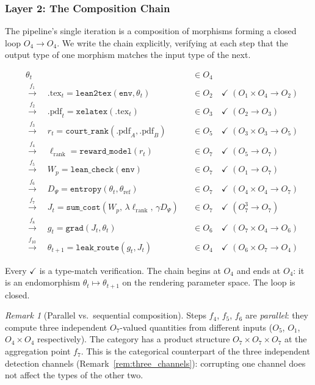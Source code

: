 \documentclass[11pt,a4paper]{article}
\theoremstyle{definition}
\theoremstyle{remark}
\newtheorem{remark}[theorem]{Remark}
\begin{document}
\subsubsection*{Layer 2: The Composition Chain}

The pipeline's single iteration is a composition of morphisms forming a closed loop $O_4 \to O_4$. We write the chain explicitly, verifying at each step that the output type of one morphism matches the input type of the next.

\begin{equation}\label{eq:chain}
\boxed{
\begin{aligned}
&\theta_t &&\in O_4 \\
&\xrightarrow{f_1} \quad \text{.tex}_t = \texttt{lean2tex}(\texttt{env}, \theta_t) &&\in O_2 \quad\checkmark\; (O_1 \times O_4 \to O_2) \\
&\xrightarrow{f_2} \quad \text{.pdf}_t = \texttt{xelatex}(\text{.tex}_t) &&\in O_3 \quad\checkmark\; (O_2 \to O_3) \\
&\xrightarrow{f_3} \quad r_t = \texttt{court\_rank}(\text{.pdf}_A, \text{.pdf}_B) &&\in O_5 \quad\checkmark\; (O_3 \times O_3 \to O_5) \\
&\xrightarrow{f_4} \quad \ell_{\mathrm{rank}} = \texttt{reward\_model}(r_t) &&\in O_7 \quad\checkmark\; (O_5 \to O_7) \\
&\xrightarrow{f_5} \quad W_p = \texttt{lean\_check}(\texttt{env}) &&\in O_7 \quad\checkmark\; (O_1 \to O_7) \\
&\xrightarrow{f_6} \quad D_\Psi = \texttt{entropy}(\theta_t, \theta_{\mathrm{ref}}) &&\in O_7 \quad\checkmark\; (O_4 \times O_4 \to O_7) \\
&\xrightarrow{f_7} \quad J_t = \texttt{sum\_cost}(W_p,\, \lambda \ell_{\mathrm{rank}},\, \gamma D_\Psi) &&\in O_7 \quad\checkmark\; (O_7^3 \to O_7) \\
&\xrightarrow{f_8} \quad g_t = \texttt{grad}(J_t, \theta_t) &&\in O_6 \quad\checkmark\; (O_7 \times O_4 \to O_6) \\
&\xrightarrow{f_{10}} \quad \theta_{t+1} = \texttt{leak\_route}(g_t, J_t) &&\in O_4 \quad\checkmark\; (O_6 \times O_7 \to O_4)
\end{aligned}
}
\end{equation}

Every $\checkmark$ is a type-match verification. The chain begins at $O_4$ and ends at $O_4$: it is an endomorphism $\theta_t \mapsto \theta_{t+1}$ on the rendering parameter space. The loop is closed.

\begin{remark}[Parallel vs.\ sequential composition]
Steps $f_4$, $f_5$, $f_6$ are \emph{parallel}: they compute three independent $O_7$-valued quantities from different inputs ($O_5$, $O_1$, $O_4 \times O_4$ respectively). The category has a product structure $O_7 \times O_7 \times O_7$ at the aggregation point $f_7$. This is the categorical counterpart of the three independent detection channels (Remark~\ref{rem:three_channels}): corrupting one channel does not affect the types of the other two.
\end{remark}
\end{document}
